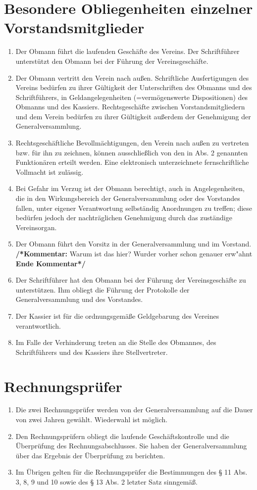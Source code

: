 \documentclass[a4paper,12pt]{article}
\newcommand{\comment}[1]{{\bf /*Kommentar:} #1 {\bf Ende Kommentar*/}}
\begin{document}
\section{Besondere Obliegenheiten einzelner Vorstandsmitglieder} %
\begin{enumerate}
\item Der Obmann führt die laufenden Geschäfte des Vereins. Der Schriftführer unterstützt den Obmann bei der Führung der Vereinsgeschäfte.
\item Der Obmann vertritt den Verein nach außen. Schriftliche Ausfertigungen des Vereins bedürfen zu ihrer Gültigkeit der Unterschriften des Obmanns und des Schriftführers, in Geldangelegenheiten (=vermögenswerte Dispositionen) des Obmanns und des Kassiers. Rechtsgeschäfte zwischen Vorstandsmitgliedern und dem Verein bedürfen zu ihrer Gültigkeit außerdem der Genehmigung der Generalversammlung.
\item Rechtsgeschäftliche Bevollmächtigungen, den Verein nach außen zu vertreten bzw. für ihn zu zeichnen, können ausschließlich von den in Abs. 2 genannten Funktionären erteilt werden. Eine elektronisch unterzeichnete fernschriftliche Vollmacht ist zulässig.
\item Bei Gefahr im Verzug ist der Obmann berechtigt, auch in Angelegenheiten, die in den Wirkungsbereich der Generalversammlung oder des Vorstandes fallen, unter eigener Verantwortung selbständig Anordnungen zu treffen; diese bedürfen jedoch der nachträglichen Genehmigung durch das zuständige Vereinsorgan.
\item Der Obmann führt den Vorsitz in der Generalversammlung und im Vorstand.
\comment{Warum ist das hier? Wurder vorher schon genauer erw"ahnt}
\item Der Schriftführer hat den Obmann bei der Führung der Vereinsgeschäfte zu unterstützen. Ihm obliegt die Führung der Protokolle der Generalversammlung und des Vorstandes.
\item Der Kassier ist für die ordnungsgemäße Geldgebarung des Vereines verantwortlich.
\item Im Falle der Verhinderung treten an die Stelle des Obmannes, des Schriftführers und des Kassiers ihre Stellvertreter.
\end{enumerate}

\section{Rechnungsprüfer} %
\begin{enumerate}
\item Die zwei Rechnungsprüfer werden von der Generalversammlung auf die Dauer von zwei Jahren gewählt. Wiederwahl ist möglich.
\item Den Rechnungsprüfern obliegt die laufende Geschäftskontrolle und die Überprüfung des Rechnungsabschlusses. Sie haben der Generalversammlung über das Ergebnis der Überprüfung zu berichten.
\item Im Übrigen gelten für die Rechnungsprüfer die Bestimmungen des § 11 Abs. 3, 8, 9 und 10 sowie des § 13 Abs. 2 letzter Satz sinngemäß.
\end{enumerate}
\end{document}

